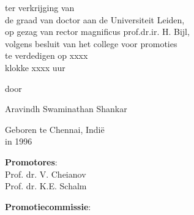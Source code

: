 \begin{titlepage}
\begin{center}
    
     {\large ter verkrijging van \\ de graad van doctor aan de Universiteit Leiden, \\ op gezag van rector magnificus prof.dr.ir. H. Bijl, \\ volgens besluit van het college voor promoties \\ te verdedigen op xxxx \\ klokke xxxx uur}
	
	\vspace{3\baselineskip} %
	
    {\large door}  %
    
    \vspace{3\baselineskip} %
    
	{\Large Aravindh Swaminathan Shankar}
    
    
    {\large Geboren te Chennai, Indi{\"e}\\in 1996}
    
	\vfill %
\end{center}

\clearpage
\thispagestyle{empty}

\medskip
\noindent \textbf{Promotores}:\\
Prof. dr. V. Cheianov\\
Prof. dr. K.E. Schalm 

\bigskip
\noindent \textbf{Promotiecommissie}: \\




\end{titlepage}
